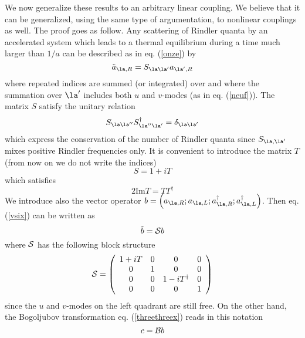 We now generalize these results to an arbitrary linear coupling.
We
believe
that it can be generalized, using the same type of argumentation,
 to nonlinear couplings as well. The
proof goes as follow. Any scattering of Rindler quanta by an accelerated
system which leads to a thermal equilibrium during a time much larger
than
$1/a$ can be described as in eq. (\ref{onze}) by
\begin{equation}
\tilde a_{\la,R} =  S_{\la \la^\prime} a_{\la^\prime,R}
 \label{vsix}
\end{equation}
where repeated indices are summed (or integrated) over and where the
summation over $\la^\prime$ includes both $u$ and $v$-modes (as in
eq. (\ref{neuf})).
 The matrix $S$ satisfy the
unitary relation
\begin{equation}
 S_{\la \la^{\prime\prime}}  S_{\la^{\prime\prime} \la^\prime}^\dagger
 = \delta _{\la \la^\prime}
 \label{vseven}
\end{equation}
which express the conservation of the number of Rindler quanta since
$S_{\la, \la^\prime}$ mixes positive Rindler frequencies only.
It is convenient to introduce the matrix $T$ (from now on we
do not write the indices)
\begin{equation}
S=1+iT
 \label{veight}
\end{equation}
which satisfies
\begin{equation}
2 \mbox{Im} T = TT^\dagger
\label{vnine}
\end{equation}
We introduce also the vector operator $b= \left( a_{\la,R};a_{\la,L};
a_{\la,R}^\dagger;a_{\la,L}^\dagger \right) $. Then eq. (\ref{vsix})
 can be written as
\begin{equation}
\tilde b= {\cal  S} b
\label{trente}
\end{equation}
where $ {\cal S}$ has the following block structure
\begin{equation}
 {\cal  S} =
\left( \begin{array}{cccc}
1+iT & 0 & 0 & 0 \\
0 & 1 & 0 & 0 \\
0 & 0 & 1-iT^\dagger & 0 \\
0 & 0 & 0 & 1
\end{array} \right)
\label{tone}
\end{equation}
since the $u$ and $v$-modes on the left quadrant are still free.
On the other hand, the Bogoljubov transformation eq. (\ref{threethreex})
 reads in this
notation
\begin{equation}
c ={ \cal  B} b
\label{ttwo}
\end{equation}
